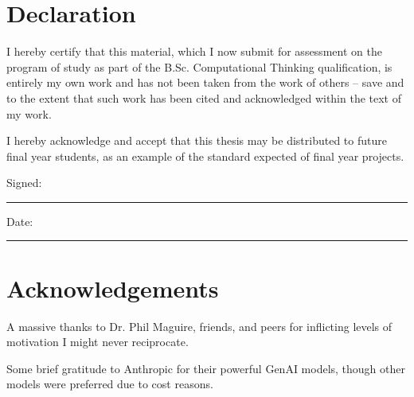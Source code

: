 \documentclass[12pt,a4paper,twoside]{report}
\begin{document}
\newpage

\tableofcontents

\newpage

\thispagestyle{empty}


\section*{Declaration}

I hereby certify that this material, which I now submit for assessment on the program of study as part of the B.Sc. Computational Thinking qualification, is entirely my own work and has not been taken from the work of others -- save and to the extent that such work has been cited and acknowledged within the text of my work.

I hereby acknowledge and accept that this thesis may be distributed to future final year students, as an example of the standard expected of final year projects.


\vspace{2cm}

Signed: \rule{5cm}{0.4pt} \hfill Date: \rule{3cm}{0.4pt}

\vspace{2cm}

\null
\newpage
\thispagestyle{empty}


\section*{Acknowledgements}

A massive thanks to Dr. Phil Maguire, friends, and peers for inflicting levels of motivation I might never reciprocate.

Some brief gratitude to Anthropic for their powerful GenAI models, though other models were preferred due to cost reasons.

\vfill
\null

\newpage
\end{document}
